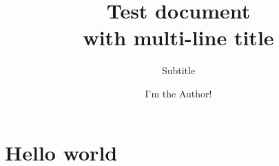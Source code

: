 \documentclass[twocolumn]{article}
\title{Test document\\with multi-line title}
\subtitle{Subtitle}
\author{I'm the Author!}
\begin{document}
\maketitle
\section{Hello world}
\end{document}

